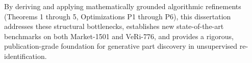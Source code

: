 By deriving and applying mathematically grounded algorithmic refinements (Theorems 1 through 5, Optimizations P1 through P6), this dissertation addresses these structural bottlenecks, establishes new state-of-the-art benchmarks on both Market-1501 and VeRi-776, and provides a rigorous, publication-grade foundation for generative part discovery in unsupervised re-identification.
